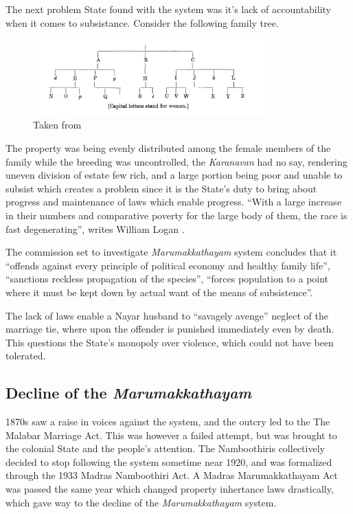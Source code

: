 \documentclass[a4paper]{article}
\begin{document}
The next problem State found with the system was
it's lack of accountability when it comes to
subsistance. Consider the following family tree.


\begin{figure}[!ht]
    \begin{center}
        \includegraphics[width=0.8\textwidth]{marum_family_tree}
    \end{center}
    \caption{Taken from \cite[261]{panikkar1918some}}
\end{figure}

The property was being evenly distributed among
the female members of the family while the
breeding was uncontrolled, the \emph{Karanavan}
had no say, rendering uneven division of estate
few rich, and a large portion being poor and
unable to subsist which creates a problem since it
is the State's duty to bring about progress and
maintenance of laws which enable progress. ``With a
large increase in their numbers and comparative
poverty for the large body of them, the race is
fast degenerating'', writes William Logan
\cite[138]{logan1887malabar}. 

The commission set to investigate
\emph{Marumakkathayam} system concludes that it
``offends against every principle of political
economy and healthy family life'', ``sanctions
reckless propagation of the species'', ``forces
population to a point where it must be kept down
by actual want of the means of subsistence''.

The lack of laws enable a Nayar husband to
``savagely avenge''\cite[63]{menon1894report}
neglect of the marriage tie, where upon the
offender is punished immediately even by death.
This questions the State's monopoly over violence,
which could not have been tolerated.


\subsection{Decline of the \emph{Marumakkathayam}}
1870s saw a raise in voices against the system,
and the outcry led to the The Malabar Marriage
Act. This was however a failed attempt, but was
brought to the colonial State and the people's
attention. The Namboothiris collectively decided
to stop following the system sometime near 1920,
and was formalized through the 1933 Madras
Namboothiri Act. A Madras Marumakkathayam Act was
passed the same year which changed property
inhertance laws drastically, which gave way to the
decline of the \emph{Marumakkathayam} system.
\end{document}
